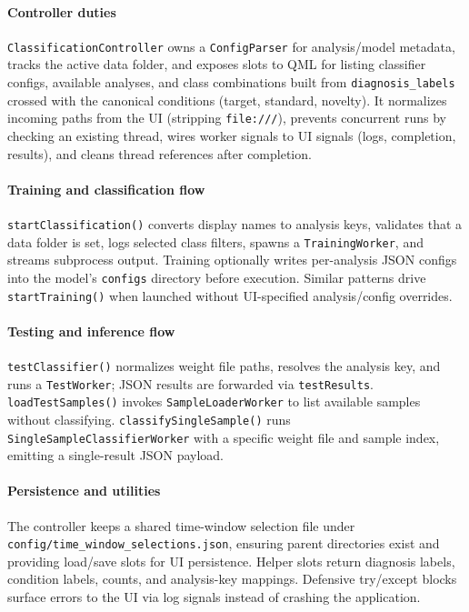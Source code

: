 \documentclass[12pt]{report}
\begin{document}
\paragraph{Controller duties}\mbox{}

\texttt{ClassificationController} owns a \texttt{ConfigParser} for analysis/model metadata, tracks the active data folder, and exposes slots to QML for listing classifier configs, available analyses, and class combinations built from \texttt{diagnosis\_labels} crossed with the canonical conditions (target, standard, novelty). It normalizes incoming paths from the UI (stripping \texttt{file:///}), prevents concurrent runs by checking an existing thread, wires worker signals to UI signals (logs, completion, results), and cleans thread references after completion.

\paragraph{Training and classification flow}\mbox{}

\texttt{startClassification()} converts display names to analysis keys, validates that a data folder is set, logs selected class filters, spawns a \texttt{TrainingWorker}, and streams subprocess output. Training optionally writes per-analysis JSON configs into the model's \texttt{configs} directory before execution. Similar patterns drive \texttt{startTraining()} when launched without UI-specified analysis/config overrides.

\paragraph{Testing and inference flow}\mbox{}

\texttt{testClassifier()} normalizes weight file paths, resolves the analysis key, and runs a \texttt{TestWorker}; JSON results are forwarded via \texttt{testResults}. \texttt{loadTestSamples()} invokes \texttt{SampleLoaderWorker} to list available samples without classifying. \texttt{classifySingleSample()} runs \texttt{SingleSampleClassifierWorker} with a specific weight file and sample index, emitting a single-result JSON payload.

\paragraph{Persistence and utilities}\mbox{}

The controller keeps a shared time-window selection file under \texttt{config/time\_window\_selections.json}, ensuring parent directories exist and providing load/save slots for UI persistence. Helper slots return diagnosis labels, condition labels, counts, and analysis-key mappings. Defensive try/except blocks surface errors to the UI via log signals instead of crashing the application.
\end{document}
